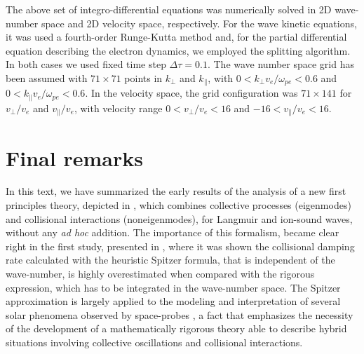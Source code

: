 \documentclass[12pt,a4paper,ruledheader]{report}
\begin{document}
The above set of integro-differential equations was numerically solved in
2D wave-number space and 2D velocity space, respectively. For the wave kinetic
equations, it was used a fourth-order Runge-Kutta method and, for the partial
differential equation describing the electron dynamics, we employed the
splitting algorithm. In both cases we used fixed time step $\Delta \tau=0.1$.
The wave number space grid has been assumed with $71\times 71$ points in
$k_{\perp}$ and $k_{\parallel}$, with $0<k_{\perp}v_e/\omega_{pe}<0.6$ and
$0<k_{\parallel}v_e/\omega_{pe}<0.6$. In the velocity space, the grid
configuration was  $71\times 141$ for $v_{\perp}/v_e$ and $v_{\parallel}/v_e$,
with velocity range $0<v_{\perp}/v_e<16$ and $-16<v_{\parallel}/v_e<16$.




\chapter{Final remarks}
\label{cha:final}
In this text, we have summarized the early results of the analysis of a new first
principles theory, depicted in , which combines collective
processes (eigenmodes) and collisional interactions (noneigenmodes), for Langmuir
and ion-sound waves, without any \emph{ad hoc} addition. The importance of this
formalism, became clear right in the first study, presented in ,
where it was shown the collisional damping rate calculated with the heuristic
Spitzer formula, that is independent of the wave-number, is highly overestimated
when compared with the rigorous expression, which has to be integrated in the
wave-number space. The Spitzer approximation is largely applied to the modeling
and interpretation of several solar phenomena observed by space-probes \cite{
  Vinas2000,Hannah2009,ZVST11,KRB12,KF13,RR14,Reid2015}, a fact that emphasizes
the necessity of the development of a mathematically rigorous theory able to
describe hybrid situations involving collective oscillations and collisional
interactions.
\end{document}
